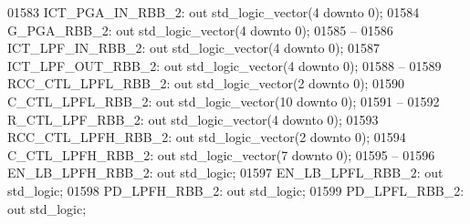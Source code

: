 \begin{DoxyCode}
01583         ICT\_PGA\_IN\_RBB\_2:   \textcolor{keywordflow}{out} \textcolor{comment}{std\_logic\_vector}(\textcolor{vhdllogic}{}\textcolor{vhdllogic}{4} \textcolor{keywordflow}{downto} \textcolor{vhdllogic}{}\textcolor{vhdllogic}{0});
01584         G\_PGA\_RBB\_2:    \textcolor{keywordflow}{out} \textcolor{comment}{std\_logic\_vector}(\textcolor{vhdllogic}{}\textcolor{vhdllogic}{4} \textcolor{keywordflow}{downto} \textcolor{vhdllogic}{}\textcolor{vhdllogic}{0});
01585 \textcolor{keyword}{        --}
01586         ICT\_LPF\_IN\_RBB\_2:   \textcolor{keywordflow}{out} \textcolor{comment}{std\_logic\_vector}(\textcolor{vhdllogic}{}\textcolor{vhdllogic}{4} \textcolor{keywordflow}{downto} \textcolor{vhdllogic}{}\textcolor{vhdllogic}{0});
01587         ICT\_LPF\_OUT\_RBB\_2:  \textcolor{keywordflow}{out} \textcolor{comment}{std\_logic\_vector}(\textcolor{vhdllogic}{}\textcolor{vhdllogic}{4} \textcolor{keywordflow}{downto} \textcolor{vhdllogic}{}\textcolor{vhdllogic}{0});
01588 \textcolor{keyword}{        --}
01589         RCC\_CTL\_LPFL\_RBB\_2: \textcolor{keywordflow}{out} \textcolor{comment}{std\_logic\_vector}(\textcolor{vhdllogic}{}\textcolor{vhdllogic}{2} \textcolor{keywordflow}{downto} \textcolor{vhdllogic}{}\textcolor{vhdllogic}{0});
01590         C\_CTL\_LPFL\_RBB\_2:   \textcolor{keywordflow}{out} \textcolor{comment}{std\_logic\_vector}(\textcolor{vhdllogic}{}\textcolor{vhdllogic}{10} \textcolor{keywordflow}{downto} \textcolor{vhdllogic}{}\textcolor{vhdllogic}{0});
01591 \textcolor{keyword}{        --}
01592         R\_CTL\_LPF\_RBB\_2:    \textcolor{keywordflow}{out} \textcolor{comment}{std\_logic\_vector}(\textcolor{vhdllogic}{}\textcolor{vhdllogic}{4} \textcolor{keywordflow}{downto} \textcolor{vhdllogic}{}\textcolor{vhdllogic}{0});
01593         RCC\_CTL\_LPFH\_RBB\_2: \textcolor{keywordflow}{out} \textcolor{comment}{std\_logic\_vector}(\textcolor{vhdllogic}{}\textcolor{vhdllogic}{2} \textcolor{keywordflow}{downto} \textcolor{vhdllogic}{}\textcolor{vhdllogic}{0});
01594         C\_CTL\_LPFH\_RBB\_2:   \textcolor{keywordflow}{out} \textcolor{comment}{std\_logic\_vector}(\textcolor{vhdllogic}{}\textcolor{vhdllogic}{7} \textcolor{keywordflow}{downto} \textcolor{vhdllogic}{}\textcolor{vhdllogic}{0});
01595 \textcolor{keyword}{        --}
01596         EN\_LB\_LPFH\_RBB\_2:   \textcolor{keywordflow}{out} \textcolor{comment}{std\_logic};
01597         EN\_LB\_LPFL\_RBB\_2:   \textcolor{keywordflow}{out} \textcolor{comment}{std\_logic};
01598         PD\_LPFH\_RBB\_2:  \textcolor{keywordflow}{out} \textcolor{comment}{std\_logic};
01599         PD\_LPFL\_RBB\_2:  \textcolor{keywordflow}{out} \textcolor{comment}{std\_logic};

\end{DoxyCode}
